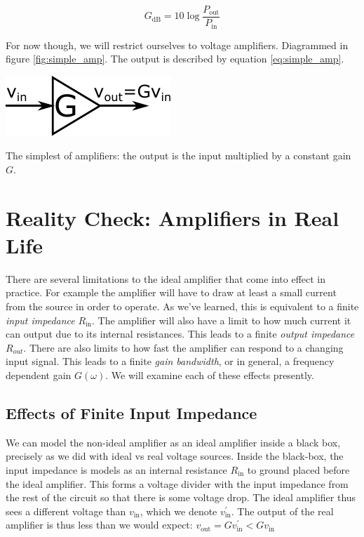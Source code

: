 \documentclass{tufte-book}
\begin{document}
\begin{equation}
\label{eq:power_amp_dB}
G_\text{dB} = 10\log\frac{P_\text{out}}{P_\text{in}} 
\end{equation}

\noindent For now though, we will restrict ourselves to voltage amplifiers. Diagrammed in figure \ref{fig:simple_amp}. The output is described by equation \ref{eq:simple_amp}.

\begin{marginfigure}%
  \includegraphics[width=\linewidth]{SimpleAmplifier}
  \caption{The simplest of amplifiers: the output is the input multiplied by a constant gain $G$.}
  \label{fig:simple_amp}
\end{marginfigure}

\section{Reality Check: Amplifiers in Real Life}
There are several limitations to the ideal amplifier that come into effect in practice. For example the amplifier will have to draw at least a small current from the source in order to operate. As we've learned, this is equivalent to a finite \textit{input impedance} $R_\text{in}$. The amplifier will also have a limit to how much current it can output due to its internal resistances. This leads to a finite \textit{output impedance} $R_{out}$. There are also limits to how fast the amplifier can respond to a changing input signal. This leads to a finite \textit{gain bandwidth}, or in general, a frequency dependent gain $G(\omega)$. We will examine each of these effects presently.

\subsection{Effects of Finite Input Impedance}
\label{sec:AMP_effect_input}
We can model the non-ideal amplifier as an ideal amplifier inside a black box, precisely as we did with ideal vs real voltage sources. Inside the black-box, the input impedance is models as an internal resistance $R_\text{in}$ to ground placed before the ideal amplifier. This forms a voltage divider with the input impedance from the rest of the circuit so that there is some voltage drop. The ideal amplifier thus sees a different voltage than $v_\text{in}$, which we denote $v^\prime_\text{in}$. The output of the real amplifier is thus less than we would expect: $v_\text{out} = Gv^\prime_\text{in} < Gv_\text{in}$
\end{document}
